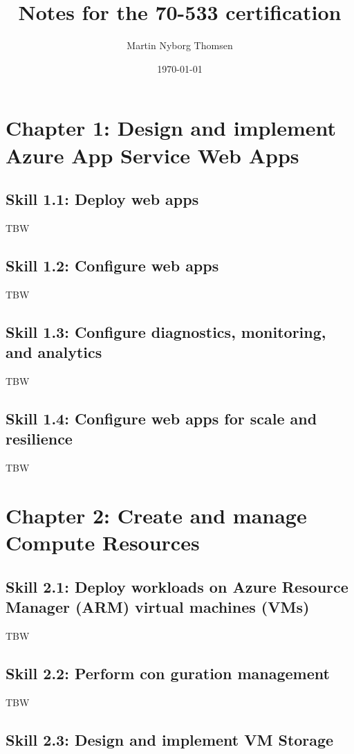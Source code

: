 \documentclass[12pt]{article}
\title{Notes for the 70-533 certification}
\author{Martin Nyborg Thomsen}
\date{\today}
\begin{document}
\maketitle

\section{Chapter 1: Design and implement Azure App Service Web Apps}

\subsection{Skill 1.1: Deploy web apps}
TBW

\subsection{Skill 1.2: Configure web apps}
TBW

\subsection{Skill 1.3: Configure diagnostics, monitoring, and analytics}
TBW

\subsection{Skill 1.4: Configure web apps for scale and resilience}
TBW

\section{Chapter 2: Create and manage Compute Resources}

\subsection{Skill 2.1: Deploy workloads on Azure Resource Manager (ARM) virtual machines (VMs)}
TBW

\subsection{Skill 2.2: Perform con guration management}
TBW

\subsection{Skill 2.3: Design and implement VM Storage}
\end{document}
